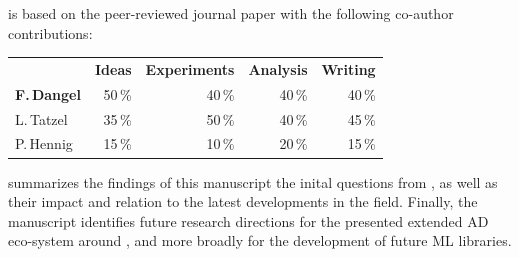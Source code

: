 \begin{disclaimer}
   is based on the peer-reviewed journal paper with the
  following co-author contributions:

   \cite{dangel2022vivit}

  \vspace{-1.75ex}

  \begin{center}
    \begin{tabular}[!h]{lrrrr}
      & \textbf{Ideas} & \textbf{Experiments} & \textbf{Analysis} & \textbf{Writing}
      \\
      \textbf{F.\,Dangel} & 50\,\% & 40\,\% & 40\,\% & 40\,\%
      \\
      L.\,Tatzel & 35\,\%& 50\,\% & 40\,\% & 45\,\%
      \\
      P.\,Hennig & 15\,\% & 10\,\% & 20\,\% & 15\,\%
    \end{tabular}
  \end{center}
\end{disclaimer}

 summarizes the findings of this manuscript \wrt the
inital questions from , as well as their
impact and relation to the latest developments in the field. Finally, the
manuscript identifies future research directions for the presented extended AD
eco-system around \pytorch, and more broadly for the development of future ML
libraries.

